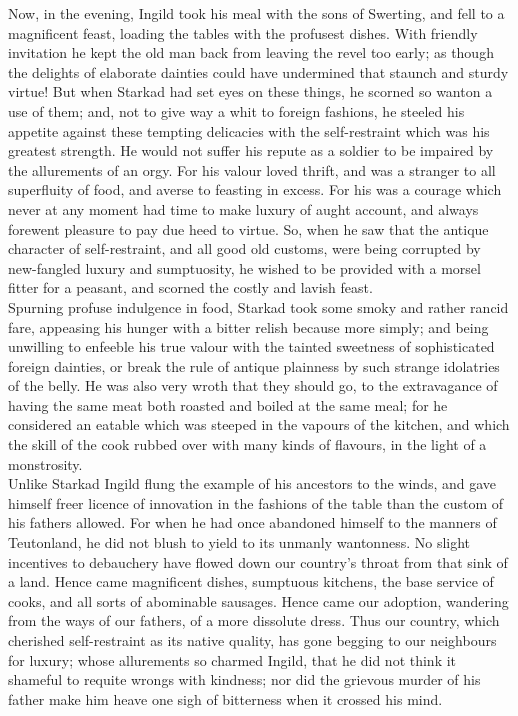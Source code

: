\documentclass[10pt,a4paper]{report}
\begin{document}
Now, in the evening, Ingild took his meal with the sons of Swerting, and fell to a magnificent feast, loading the tables with the profusest dishes. With friendly invitation he kept the old man back from leaving the revel too early; as though the delights of elaborate dainties could have undermined that staunch and sturdy virtue! But when Starkad had set eyes on these things, he scorned so wanton a use of them; and, not to give way a whit to foreign fashions, he steeled his appetite against these tempting delicacies with the self-restraint which was his greatest strength. He would not suffer his repute as a soldier to be impaired by the allurements of an orgy. For his valour loved thrift, and was a stranger to all superfluity of food, and averse to feasting in excess. For his was a courage which never at any moment had time to make luxury of aught account, and always forewent pleasure to pay due heed to virtue. So, when he saw that the antique character of self-restraint, and all good old customs, were being corrupted by new-fangled luxury and sumptuosity, he wished to be provided with a morsel fitter for a peasant, and scorned the costly and lavish feast.\\

Spurning profuse indulgence in food, Starkad took some smoky and rather rancid fare, appeasing his hunger with a bitter relish because more simply; and being unwilling to enfeeble his true valour with the tainted sweetness of sophisticated foreign dainties, or break the rule of antique plainness by such strange idolatries of the belly. He was also very wroth that they should go, to the extravagance of having the same meat both roasted and boiled at the same meal; for he considered an eatable which was steeped in the vapours of the kitchen, and which the skill of the cook rubbed over with many kinds of flavours, in the light of a monstrosity.\\

Unlike Starkad Ingild flung the example of his ancestors to the winds, and gave himself freer licence of innovation in the fashions of the table than the custom of his fathers allowed. For when he had once abandoned himself to the manners of Teutonland, he did not blush to yield to its unmanly wantonness. No slight incentives to debauchery have flowed down our country's throat from that sink of a land. Hence came magnificent dishes, sumptuous kitchens, the base service of cooks, and all sorts of abominable sausages. Hence came our adoption, wandering from the ways of our fathers, of a more dissolute dress. Thus our country, which cherished self-restraint as its native quality, has gone begging to our neighbours for luxury; whose allurements so charmed Ingild, that he did not think it shameful to requite wrongs with kindness; nor did the grievous murder of his father make him heave one sigh of bitterness when it crossed his mind.\\
\end{document}
